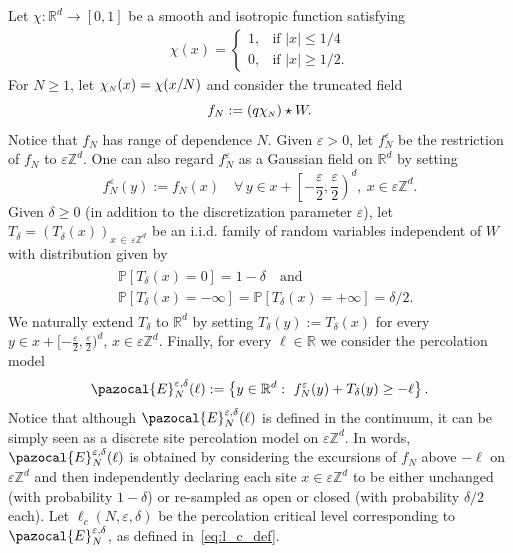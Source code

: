 \documentclass[AHL,Unicode,longabstracts,published]{cedram}
\renewcommand{\P}{\mathbb{P}}
\newcommand{\R}{\mathbb{R}}
\newcommand{\Z}{\mathbb{Z}}
\newcommand{\sN}{{\mathchoice{}{}{\scriptscriptstyle}{}N}}
\let\oldforall\forall
\renewcommand*{\forall}{\mathrel{\oldforall}}
\newcommand{\R}{\mathbb{R}}
\newcommand{\Z}{\mathbb{Z}}
\begin{document}
Let $\chi:\R^d\to [0,1]$ be a smooth and isotropic function satisfying
\begin{align*}
\chi(x)=
\begin{cases}
1, &\text{if } |x|\leq 1/4 \\
0, &\text{if } |x|\geq 1/2.
\end{cases}
\end{align*}
For $N\geq 1$, let $\chi_{\sN}(x)=\chi(x/N)$ and consider the truncated field
\begin{equation}
f_{N}:=\left(q\chi_{\sN}\right)\star W.
\end{equation}
Notice that $f_N$ has range of dependence $N$. Given $\varepsilon>0$, let $f_N^\varepsilon$ be the restriction of $f_N$ to $\varepsilon\Z^d$. One can also regard $f_N^{\varepsilon}$ as a Gaussian field on $\R^d$ by setting
\begin{equation}
f_N^\varepsilon(y):=f_N(x)\quad\forall\, y\in x+\left[-\frac{\varepsilon}{2},\frac{\varepsilon}{2}\right)^d,~x\in \varepsilon\Z^d.
\end{equation}
Given $\delta\geq0$ (in addition to the discretization parameter $\varepsilon$), let $T_\delta=(T_\delta(x))_{x\,\in\,\varepsilon\Z^d}$ be an i.i.d. family of random variables independent of $W$ with distribution given by
\begin{align}
\begin{split}
&\P\left[T_\delta(x)=0\right]=1-\delta\quad\text{and}\\
&\P\left[T_\delta(x)=-\infty\right]=\P\left[T_\delta(x)=+\infty\right]=\delta/2.
\end{split}
\end{align}
We naturally extend $T_\delta$ to $\R^d$ by setting $T_\delta(y):=T_\delta(x)$ for every $y\in x+[-\frac{\varepsilon}{2},\frac{\varepsilon}{2})^d$, $x\in\varepsilon\Z^d$. Finally, for every $\ell\in \R$ we consider the percolation model
\begin{equation}
\pazocal{E}_N^{\varepsilon,\delta}(\ell):= \left\{y\in \R^d :~f_N^\varepsilon(y)+T_\delta(y)\geq -\ell\right\}.
\end{equation}
Notice that although $\pazocal{E}_N^{\varepsilon,\delta}(\ell)$ is defined in the continuum, it can be simply seen as a discrete site percolation model on $\varepsilon\Z^d$. In words, $\pazocal{E}_N^{\varepsilon,\delta}(\ell)$ is obtained by considering the excursions of $f_N$ above $-\ell$ on $\varepsilon\Z^d$ and then independently declaring each site $x\in\varepsilon\Z^d$ to be either unchanged (with probability $1-\delta$) or re-sampled as open or closed (with probability $\delta/2$ each). Let $\ell_c(N,\varepsilon,\delta)$ be the percolation critical level corresponding to $\pazocal{E}^{\varepsilon,\delta}_N$, as defined in~\eqref{eq:l_c_def}.
\end{document}
